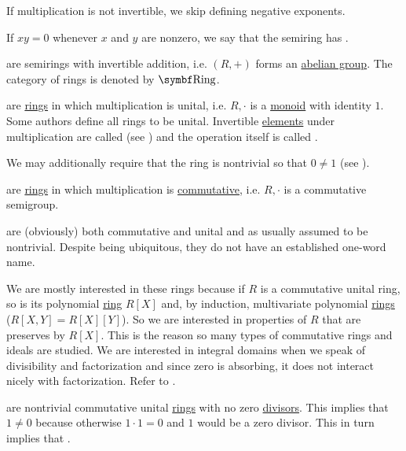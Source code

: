 \begin{definition}
\begin{DefEnum}[resume=def:semiring]
    If multiplication is not invertible, we skip defining negative exponents.

     If \( xy = 0 \) whenever \( x \) and \( y \) are nonzero, we say that the semiring has .

      are semirings with invertible addition, i.e. \( (R, +) \) forms an \hyperref[def:abelian_group]{abelian group}. The category of rings is denoted by \( \Cat{Ring} \).

      are \hyperref[def:semiring/ring]{rings} in which multiplication is unital, i.e. \( R, \cdot \) is a \hyperref[def:unital_magma/associative]{monoid} with identity \( 1 \). Some authors define all rings to be unital. Invertible \hyperref[def:algebraic_theory/invertibile_element]{elements} under multiplication are called  (see ) and the operation itself is called .

    We may additionally require that the ring is nontrivial so that \( 0 \neq 1 \) (see ).

      are \hyperref[def:semiring/ring]{rings} in which multiplication is \hyperref[def:magma/commutative]{commutative}, i.e. \( R, \cdot \) is a commutative semigroup.

      are (obviously) both commutative and unital and as usually assumed to be nontrivial. Despite being ubiquitous, they do not have an established one-word name.

    We are mostly interested in these rings because if \( R \) is a commutative unital ring, so is its polynomial \hyperref[def:algebra_of_polynomials]{ring} \( R[X] \) and, by induction\IND, multivariate polynomial \hyperref[def:multivariate_polynomial]{rings} (\( R[X, Y] = R[X][Y] \)). So we are interested in properties of \( R \) that are preserves by \( R[X] \). This is the reason so many types of commutative rings and ideals are studied. We are interested in integral domains when we speak of divisibility and factorization and since zero is absorbing, it does not interact nicely with factorization. Refer to .

      are nontrivial commutative unital \hyperref[def:semiring/commutative_unital_ring]{rings} with no zero \hyperref[def:commutative_ring_division]{divisors}. This implies that \( 1 \neq 0 \) because otherwise \( 1 \cdot 1 = 0 \) and \( 1 \) would be a zero divisor. This in turn implies that .


\end{DefEnum}
\end{definition}
